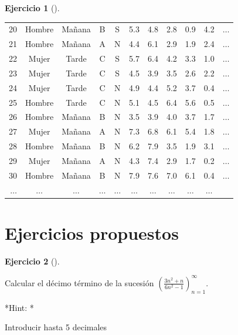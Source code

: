 \documentclass[
  a4paper,
]{scrreport}
\theoremstyle{definition}
\newtheorem{exercise}{Ejercicio}[chapter]
\theoremstyle{remark}
\begin{document}
\begin{exercise}[]
\begin{enumerate}
\begin{tcolorbox}
\begin{tabular}{r|cccccccccc}
      20 & Hombre & Mañana & B & S & 5.3 & 4.8 & 2.8 & 0.9 & 4.2 & $\dots$ \\
      21 & Hombre & Mañana & A & N & 4.4 & 6.1 & 2.9 & 1.9 & 2.4 & $\dots$ \\
      22 & Mujer & Tarde & C & S & 5.7 & 6.4 & 4.2 & 3.3 & 1.0 & $\dots$ \\
      23 & Mujer & Tarde & C & S & 4.5 & 3.9 & 3.5 & 2.6 & 2.2 & $\dots$ \\
      24 & Mujer & Tarde & C & N & 4.9 & 4.4 & 5.2 & 3.7 & 0.4 & $\dots$ \\
      25 & Hombre & Tarde & C & N & 5.1 & 4.5 & 6.4 & 5.6 & 0.5 & $\dots$ \\
      26 & Hombre & Mañana & B & N & 3.5 & 3.9 & 4.0 & 3.7 & 1.7 & $\dots$ \\
      27 & Mujer & Mañana & A & N & 7.3 & 6.8 & 6.1 & 5.4 & 1.8 & $\dots$ \\
      28 & Hombre & Mañana & B & N & 6.2 & 7.9 & 3.5 & 1.9 & 3.1 & $\dots$ \\
      29 & Mujer & Mañana & A & N & 4.3 & 7.4 & 2.9 & 1.7 & 0.2 & $\dots$ \\
      30 & Hombre & Mañana & B & N & 7.9 & 7.6 & 7.0 & 6.1 & 0.4 & $\dots$ \\
      $\dots$ & $\dots$ & $\dots$ & $\dots$ & $\dots$ & $\dots$ & $\dots$ & $\dots$ & $\dots$ & $\dots$ &  \\
  \end{tabular}

  \end{tcolorbox}
\end{enumerate}

\end{exercise}

\section{Ejercicios propuestos}\label{ejercicios-propuestos}

\begin{exercise}[]\protect\hypertarget{exr-sucesiones-propuesto-1}{}\label{exr-sucesiones-propuesto-1}

Calcular el décimo término de la sucesión
\(\left(\frac{3n^2+n}{6n^2-1}\right)_{n=1}^\infty\).

\vspace{18pt}*Hint: *

Introducir hasta 5 decimales

\end{exercise}
\end{document}
